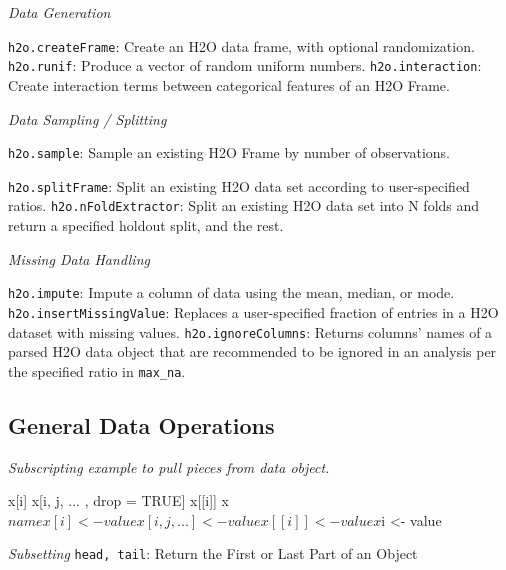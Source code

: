 \documentclass[11pt]{article}
\begin{document}
\emph{Data Generation}\par
{\texttt{h2o.createFrame}}: Create an H2O data frame, with optional randomization.\newline
{\texttt{h2o.runif}}: Produce a vector of random uniform numbers.\newline
{\texttt{h2o.interaction}}: Create interaction terms between categorical features of an H2O Frame.\newline

\emph{Data Sampling / Splitting}\par
 {\texttt{h2o.sample}}: Sample an existing H2O Frame by number of observations.\newline
{\texttt{h2o.splitFrame}: Split an existing H2O data set according to user-specified ratios.\newline
{\texttt{h2o.nFoldExtractor}}: Split an existing H2O data set into N folds and return a specified holdout split, and the rest.\newline

\emph{Missing Data Handling}\par
{\texttt{h2o.impute}}: Impute a column of data using the mean, median, or mode.\newline
{\texttt{h2o.insertMissingValue}}: Replaces a user-specified fraction of entries in a H2O dataset with missing values.\newline
{\texttt{h2o.ignoreColumns}}: Returns columns' names of a parsed H2O data object that are recommended to be ignored in an analysis per the specified ratio in {\texttt{max\_na}}.\newline
\newpage
\subsection{General Data Operations}

\emph{Subscripting example to pull pieces from data object.} 
\begin{spverbatim} 
  x[i]
  x[i, j, ... , drop = TRUE]
  x[[i]]
  x$name 

  x[i] <- value
  x[i, j, ...] <- value
  x[[i]] <- value
  x$i <- value
\end{spverbatim}

\emph{Subsetting}\newline
{\texttt{head, tail}}: Return the First or Last Part of an Object\newline

}
\end{document}
